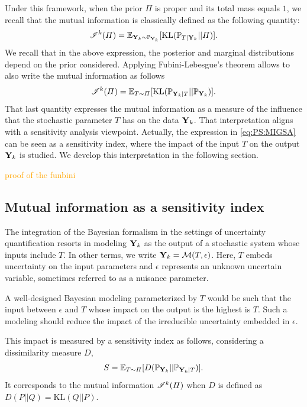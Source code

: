 Under this framework, when the prior $\varPi$ is proper and its total mass equals $1$, we recall that the mutual information is classically defined as the following quantity:
    \begin{equation}
        \mathscr{I}^k(\varPi) =  \mathbb{E}_{\mathbf{Y}_k\sim \mathbb{P}_{\mathbf{Y}_k}}[\text{KL}(\mathbb{P}_{T|\mathbf{Y}_k}||\varPi)] .
    \end{equation}
We recall that in the above expression, the posterior and marginal distributions depend on the prior considered. %
Applying Fubini-Lebesgue's theorem allows to also write the mutual information as follows
    \begin{equation}\label{eq:PS:MIGSA}
        \mathscr{I}^k(\varPi) = \mathbb{E}_{T\sim\varPi}[\text{KL}(\mathbb{P}_{\mathbf{Y}_k|T}||\mathbb{P}_{\mathbf{Y}_k}) ].
    \end{equation}
That last quantity expresses the mutual information as 
a measure of the influence that the stochastic parameter $T$ has on the data $\mathbf{Y}_k$.
That interpretation aligns with a sensitivity analysis viewpoint. Actually, the expression in \cref{eq:PS:MIGSA} can be seen as a sensitivity index, where the impact of the input $T$ on the output $\mathbf{Y}_k$ is studied. We develop this interpretation in the following section.

\textcolor{orange}{proof of the funbini}


\subsection{Mutual information as a sensitivity index}

The integration of the Bayesian formalism in the settings of uncertainty quantification resorts in modeling $\mathbf{Y}_k$ as the output of a stochastic system whose inputs include $T$. In other terms, we write $\mathbf{Y}_k=\mathcal{M}(T,\epsilon)$. Here, $T$ embeds uncertainty on  the input parameters and $\epsilon$ represents an unknown uncertain variable, sometimes referred to as a nuisance parameter.

A well-designed Bayesian modeling parameterized by $T$ would be such that the input between $\epsilon$ and $T$ whose impact on the output
is the highest is $T$. Such a modeling should reduce the impact of the irreducible uncertainty embedded in $\epsilon$.

This impact is measured by a sensitivity index as follows, considering a dissimilarity measure $D$, 
    \begin{equation}
        S = \mathbb{E}_{T\sim\varPi}[ D(\mathbb{P}_{\mathbf{Y}_k}||\mathbb{P}_{\mathbf{Y}_k|T}) ].
    \end{equation}
It corresponds to the mutual information $\mathscr{I}^k(\varPi)$ when $D$ is defined as $D(P||Q)=\text{KL}(Q||P)$.

